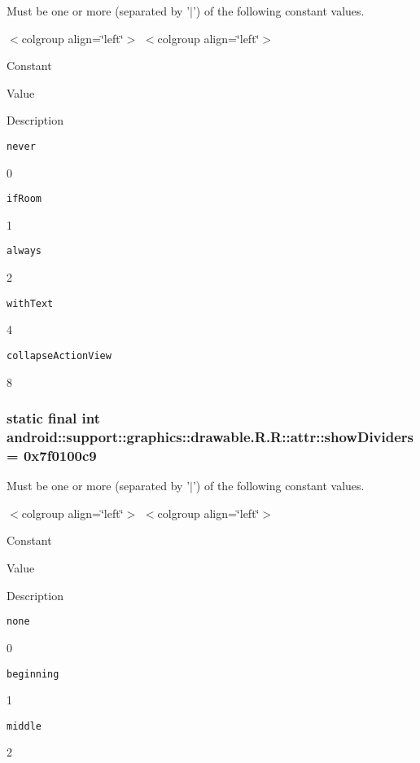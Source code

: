 Must be one or more (separated by '$|$') of the following constant values. \begin{TabularC}{0}
\hline
\end{TabularC}
$<$colgroup align=\char`\"{}left\char`\"{}$>$ $<$colgroup align=\char`\"{}left\char`\"{}$>$ 

Constant

Value

Description 

{\tt never}

0

{\tt ifRoom}

1

{\tt always}

2

{\tt withText}

4

{\tt collapseActionView}

8\hypertarget{classandroid_1_1support_1_1graphics_1_1drawable_1_1_r_1_1attr_840adc911fc47e8b8b9495e73c767110}{
\subsubsection[{showDividers}]{\setlength{\rightskip}{0pt plus 5cm}static final int android::support::graphics::drawable.R.R::attr::showDividers = 0x7f0100c9}}
\label{classandroid_1_1support_1_1graphics_1_1drawable_1_1_r_1_1attr_840adc911fc47e8b8b9495e73c767110}


Must be one or more (separated by '$|$') of the following constant values. \begin{TabularC}{0}
\hline
\end{TabularC}
$<$colgroup align=\char`\"{}left\char`\"{}$>$ $<$colgroup align=\char`\"{}left\char`\"{}$>$ 

Constant

Value

Description 

{\tt none}

0

{\tt beginning}

1

{\tt middle}

2

